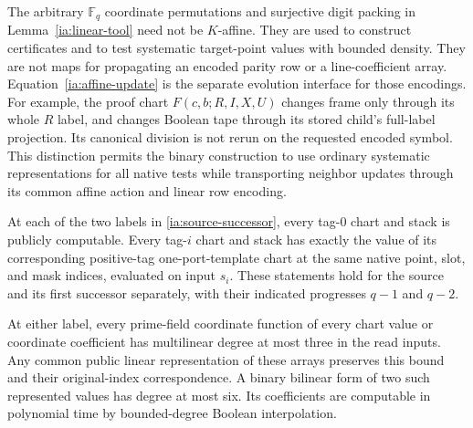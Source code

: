 \begin{remark}
\label{ia:testing-versus-evolution}
The arbitrary $\mathbb F_q$ coordinate permutations and surjective
digit packing in Lemma~\ref{ia:linear-tool} need not be $K$-affine.
They are used to construct certificates and to test systematic
target-point values with bounded density.  They are not maps for
propagating an encoded parity row or a line-coefficient array.
Equation~\eqref{ia:affine-update} is the separate evolution
interface for those encodings.  For example, the proof chart
$F(c,b;R,I,X,U)$ changes frame only through its whole $R$ label,
and changes Boolean tape through its stored child's full-label
projection.  Its canonical division is not rerun on the requested
encoded symbol.  This distinction permits the binary construction
to use ordinary systematic representations for all native tests
while transporting neighbor updates through its common affine
action and linear row encoding.
\end{remark}
\begin{lemma}
\label{ia:source-data}
At each of the two labels in \eqref{ia:source-successor}, every
tag-$0$ chart and stack is publicly computable.  Every tag-$i$
chart and stack has exactly the value of its corresponding
positive-tag one-port-template chart at the same native point,
slot, and mask indices, evaluated on input $s_i$.  These statements
hold for the source and its first successor separately, with
their indicated progresses $q-1$ and $q-2$.

At either label, every prime-field coordinate function of every
chart value or coordinate coefficient has multilinear degree at
most three in the read inputs.  Any common public linear
representation of these arrays preserves this bound and their
original-index correspondence.  A binary bilinear form of two
such represented values has degree at most six.  Its coefficients
are computable in polynomial time by bounded-degree Boolean
interpolation.
\end{lemma}

